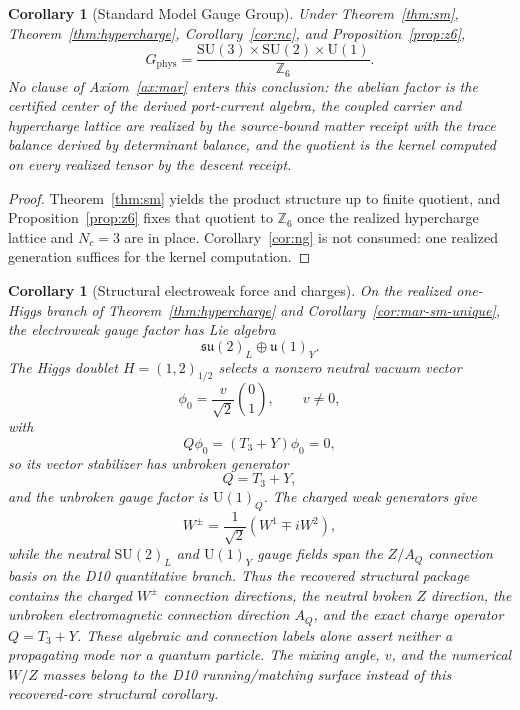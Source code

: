 \documentclass[11pt]{article}
\newtheorem{corollary}[theorem]{Corollary}
\newcommand{\SU}{\mathrm{SU}}
\newcommand{\U}{\mathrm{U}}
\begin{document}
\begin{corollary}[Standard Model Gauge Group]\label{cor:sm-gauge-group-receipts}
Under Theorem~\ref{thm:sm}, Theorem~\ref{thm:hypercharge}, Corollary~\ref{cor:nc}, and Proposition~\ref{prop:z6},
\[
G_{\mathrm{phys}}=
\frac{\SU(3)\times\SU(2)\times\U(1)}{\mathbb Z_6}.
\]
No clause of Axiom~\ref{ax:mar} enters this conclusion: the abelian factor is
the certified center of the derived port-current algebra, the coupled carrier
and hypercharge lattice are realized by the source-bound matter receipt with
the trace balance derived by determinant balance, and the quotient is the
kernel computed on every realized tensor by the descent receipt.
\end{corollary}

\begin{proof}
Theorem~\ref{thm:sm} yields the product structure up to finite quotient, and Proposition~\ref{prop:z6} fixes that quotient to $\mathbb Z_6$ once the realized hypercharge lattice and $N_c=3$ are in place. Corollary~\ref{cor:ng} is not consumed: one realized generation suffices for the kernel computation.
\end{proof}

\begin{corollary}[Structural electroweak force and charges]\label{cor:electroweak-force}
On the realized one-Higgs branch of Theorem~\ref{thm:hypercharge} and Corollary~\ref{cor:mar-sm-unique}, the electroweak gauge factor has Lie algebra
\[
\mathfrak{su}(2)_L\oplus\mathfrak{u}(1)_Y.
\]
The Higgs doublet \(H=(1,2)_{1/2}\) selects a nonzero neutral vacuum vector
\[
\phi_0=\frac{v}{\sqrt2}\binom{0}{1},\qquad v\ne0,
\]
with
\[
Q\phi_0=(T_3+Y)\phi_0=0,
\]
so its vector stabilizer has unbroken generator
\[
Q=T_3+Y,
\]
and the unbroken gauge factor is \(\U(1)_Q\). The charged weak generators give
\[
W^\pm=\frac{1}{\sqrt2}(W^1\mp iW^2),
\]
while the neutral \(\SU(2)_L\) and \(\U(1)_Y\) gauge fields span the \(Z/A_Q\) connection basis on the D10 quantitative branch. Thus the recovered structural package contains the charged \(W^\pm\) connection directions, the neutral broken \(Z\) direction, the unbroken electromagnetic connection direction \(A_Q\), and the exact charge operator \(Q=T_3+Y\). These algebraic and connection labels alone assert neither a propagating mode nor a quantum particle. The mixing angle, \(v\), and the numerical \(W/Z\) masses belong to the D10 running/matching surface instead of this recovered-core structural corollary.
\end{corollary}
\end{document}
